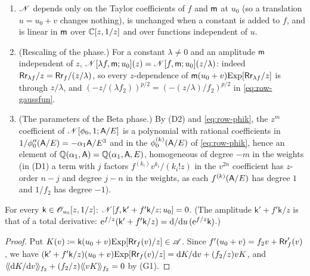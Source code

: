 \begin{defn}
\begin{enumerate}
\item[(D3)] $\mathscr{N}$ depends only on the Taylor coefficients of $f$ and $\mathsf{m}$ at $u_0$ (so a translation $u=u_0+v$ changes nothing), is unchanged when a constant is added to $f$, and is linear in $\mathsf{m}$ over $\mathbb{C}[z,1/z]$ and over functions independent of $u$.
\item[(D4)] (Rescaling of the phase.) For a constant $\lambda\neq0$ and an amplitude $\mathsf{m}$ independent of $z$, $\mathscr{N}[\lambda f,\mathsf{m};u_0](z)=\mathscr{N}[f,\mathsf{m};u_0](z/\lambda)$: indeed $\mathsf{Rr}_{\lambda f}/z=\mathsf{Rr}_f/(z/\lambda)$, so every $z$-dependence of $\mathsf{m}(u_0+v)\mathrm{Exp}[\mathsf{Rr}_{\lambda f}/z]$ is through $z/\lambda$, and $(-z/(\lambda f_2))^{p/2}=(-(z/\lambda)/f_2)^{p/2}$ in \eqref{eq:row-gaussfun}.
\item[(D5)] (The parameters of the Beta phase.) By (D2) and \eqref{eq:row-phik}, the $z^m$ coefficient of $\mathscr{N}[\phi_0,1;\mathsf{A}/E]$ is a polynomial with rational coefficients in $1/\phi_0''(\mathsf{A}/E)=-\alpha_1\mathsf{A}/E^3$ and in the $\phi_0^{(k)}(\mathsf{A}/E)$ of \eqref{eq:row-phik}, hence an element of $\mathbb{Q}(\alpha_1,\mathsf{A})=\mathbb{Q}(\alpha_1,\mathsf{A},E)$, homogeneous of degree $-m$ in the weights (in (D1) a term with $j$ factors $f^{(k_i)}v^{k_i}/(k_i!z)$ in the $v^{2n}$ coefficient has $z$-order $n-j$ and degree $j-n$ in the weights, as each $f^{(k)}(\mathsf{A}/E)$ has degree $1$ and $1/f_2$ has degree $-1$).
\end{enumerate}
\end{defn}

\begin{prop}
\label{prop:row-P3}
For every $\mathsf{k}\in\mathscr{O}_{u_0}[z,1/z]$: $\mathscr{N}[f,\mathsf{k}'+f'\mathsf{k}/z;u_0]=0$. (The amplitude $\mathsf{k}'+f'\mathsf{k}/z$ is that of a total derivative: $\mathrm{e}^{f/z}(\mathsf{k}'+f'\mathsf{k}/z)=\mathrm{d}/\mathrm{d} u\,(\mathrm{e}^{f/z}\mathsf{k})$.)
\end{prop}

\begin{proof}
Put $K(v)\coloneqq\mathsf{k}(u_0+v)\mathrm{Exp}[\mathsf{Rr}_f(v)/z]\in\mathscr{A}$. Since $f'(u_0+v)=f_2v+\mathsf{Rr}_f'(v)$, we have $(\mathsf{k}'+f'\mathsf{k}/z)(u_0+v)\mathrm{Exp}[\mathsf{Rr}_f(v)/z]=\mathrm{d} K/\mathrm{d} v+(f_2/z)vK$, and $\langle\!\langle \mathrm{d} K/\mathrm{d} v\rangle\!\rangle_{f_2}+(f_2/z)\langle\!\langle vK\rangle\!\rangle_{f_2}=0$ by (G1).
\end{proof}

